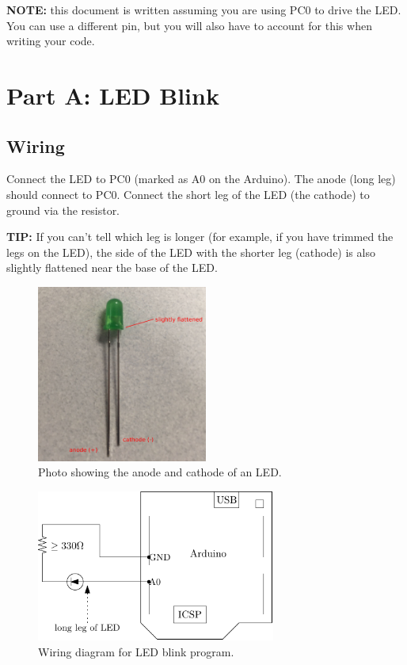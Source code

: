 \documentclass{article}
\begin{document}
\textbf{NOTE:} this document is written assuming you are using PC0 to drive the
LED. You can use a different pin, but you will also have to account for this
when writing your code.

\section{Part A: LED Blink}

\subsection{Wiring}

Connect the LED to PC0 (marked as A0 on the Arduino). The anode (long leg)
should connect to PC0. Connect the short leg of the LED (the cathode) to ground
via the resistor.

\textbf{TIP:} If you can't tell which leg is longer (for example, if you have
trimmed the legs on the LED), the side of the LED with the shorter leg
(cathode) is also slightly flattened near the base of the LED.

\begin{figure}[H]
	\centering

	\includegraphics[max width = 0.5\textwidth]{led.jpg}

	\caption{Photo showing the anode and cathode of an LED.}

\end{figure}

\begin{figure}[H]
	\centering

	\includegraphics[max width = 0.7\textwidth]{wiring_diagram.pdf}

	\caption{Wiring diagram for LED blink program.}

\end{figure}
\end{document}
